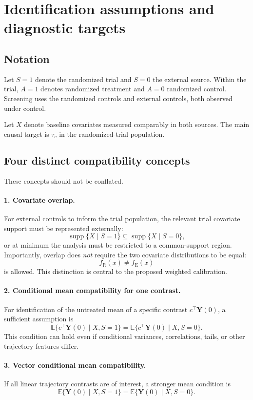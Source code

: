 \documentclass[11pt]{article}
\newcommand{\R}{\mathrm{R}}
\newcommand{\E}{\mathrm{E}}
\newcommand{\Exp}{\mathbb{E}}
\newcommand{\supp}{\operatorname{supp}}
\begin{document}
\section{Identification assumptions and diagnostic targets}

\subsection{Notation}

Let $S=1$ denote the randomized trial and $S=0$ the external source. Within the trial, $A=1$ denotes randomized treatment and $A=0$ randomized control. Screening uses the randomized controls and external controls, both observed under control.

Let $X$ denote baseline covariates measured comparably in both sources. The main causal target is $\tau_c$ in the randomized-trial population.

\subsection{Four distinct compatibility concepts}

These concepts should not be conflated.

\paragraph{1. Covariate overlap.}
For external controls to inform the trial population, the relevant trial covariate support must be represented externally:
\[
\supp\{X\mid S=1\}\subseteq \supp\{X\mid S=0\},
\]
or at minimum the analysis must be restricted to a common-support region. Importantly, overlap does \emph{not} require the two covariate distributions to be equal:
\[
f_{\R}(x)\neq f_{\E}(x)
\]
is allowed. This distinction is central to the proposed weighted calibration.

\paragraph{2. Conditional mean compatibility for one contrast.}
For identification of the untreated mean of a specific contrast $c^{\top}\bm Y(0)$, a sufficient assumption is
\[
\Exp\{c^{\top}\bm Y(0)\mid X,S=1\}
=
\Exp\{c^{\top}\bm Y(0)\mid X,S=0\}.
\tag{ME-$c$}
\]
This condition can hold even if conditional variances, correlations, tails, or other trajectory features differ.

\paragraph{3. Vector conditional mean compatibility.}
If all linear trajectory contrasts are of interest, a stronger mean condition is
\[
\Exp\{\bm Y(0)\mid X,S=1\}
=
\Exp\{\bm Y(0)\mid X,S=0\}.
\tag{VME}
\]
\end{document}
